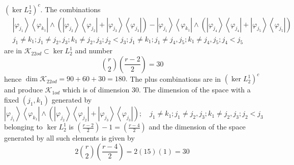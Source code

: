 \documentclass[aps,preprint]{revtex4}%
\begin{document}
$\left(  \ker L_{2}^{1}\right)  ^{c}.$ The combinations%
\begin{align}
&  \left\vert \varphi_{j_{1}}\right\rangle \left\langle \varphi_{k_{1}%
}\right\vert \wedge\left(  \left\vert \varphi_{j_{2}}\right\rangle
\left\langle \varphi_{j_{2}}\right\vert +\left\vert \varphi_{j_{3}%
}\right\rangle \left\langle \varphi_{j_{3}}\right\vert \right)  -\left\vert
\varphi_{j_{1}}\right\rangle \left\langle \varphi_{k_{1}}\right\vert
\wedge\left(  \left\vert \varphi_{j_{4}}\right\rangle \left\langle
\varphi_{j_{4}}\right\vert +\left\vert \varphi_{j_{5}}\right\rangle
\left\langle \varphi_{j_{5}}\right\vert \right) \nonumber\\
&  j_{1}\neq k_{1};j_{1}\neq j_{2},j_{3};k_{1}\neq j_{2},j_{3};j_{2}%
<j_{3};j_{1}\neq k_{1};j_{1}\neq j_{4},j_{5};k_{1}\neq j_{4},j_{5};j_{4}<j_{5}%
\end{align}
are in $\mathcal{K}_{22od}\subset\ker L_{2}^{1}$ and number%
\begin{equation}
\binom{r}{2}\left(  \frac{r-2}{2}\right)  =30
\end{equation}
hence $\dim\mathcal{K}_{22od}=90+60+30=180.$ The plus combinations are in
$\left(  \ker L_{2}^{1}\right)  ^{c}$ and produce $\mathcal{K}_{1od}$ which is
of dimension $30$. The dimension of the space with a fixed $\left(
j_{1},k_{1}\right)  $ generated by
\begin{equation}
\left\vert \varphi_{j_{1}}\right\rangle \left\langle \varphi_{k_{1}%
}\right\vert \wedge\left(  \left\vert \varphi_{j_{2}}\right\rangle
\left\langle \varphi_{j_{2}}\right\vert +\left\vert \varphi_{j_{3}%
}\right\rangle \left\langle \varphi_{j_{3}}\right\vert \right)  ;\quad
j_{1}\neq k_{1};j_{1}\neq j_{2},j_{3};k_{1}\neq j_{2},j_{3};j_{2}<j_{3}%
\end{equation}
belonging to $\ker L_{2}^{1}$ is $\left(  \frac{r-2}{2}\right)  -1=\left(
\frac{r-4}{2}\right)  $ and the dimension of the space generated by all such
elements is given by
\begin{equation}
2\binom{r}{2}\left(  \frac{r-4}{2}\right)  =2\left(  15\right)  \left(
1\right)  =30
\end{equation}
\end{document}
